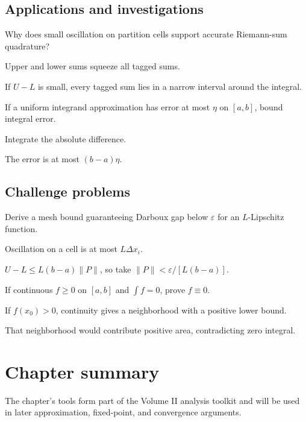 \subsection*{Applications and investigations}

\begin{exercise}\label{exr:ii10-expand-13}
Why does small oscillation on partition cells support accurate Riemann-sum quadrature?
\end{exercise}
\begin{hint}
Upper and lower sums squeeze all tagged sums.
\end{hint}
\begin{solution}
If \(U-L\) is small, every tagged sum lies in a narrow interval around the integral.
\end{solution}

\begin{exercise}\label{exr:ii10-expand-14}
If a uniform integrand approximation has error at most \(\eta\) on \([a,b]\), bound integral error.
\end{exercise}
\begin{hint}
Integrate the absolute difference.
\end{hint}
\begin{solution}
The error is at most \((b-a)\eta\).
\end{solution}

\subsection*{Challenge problems}

\begin{exercise}\label{exr:ii10-expand-15}
Derive a mesh bound guaranteeing Darboux gap below \(\varepsilon\) for an \(L\)-Lipschitz function.
\end{exercise}
\begin{hint}
Oscillation on a cell is at most \(L\Delta x_i\).
\end{hint}
\begin{solution}
\(U-L\le L(b-a)\|P\|\), so take \(\|P\|<\varepsilon/[L(b-a)]\).
\end{solution}

\begin{exercise}\label{exr:ii10-expand-16}
If continuous \(f\ge0\) on \([a,b]\) and \(\int f=0\), prove \(f\equiv0\).
\end{exercise}
\begin{hint}
If \(f(x_0)>0\), continuity gives a neighborhood with a positive lower bound.
\end{hint}
\begin{solution}
That neighborhood would contribute positive area, contradicting zero integral.
\end{solution}
\section*{Chapter summary}
The chapter's tools form part of the Volume II analysis toolkit and will be used in later approximation, fixed-point, and convergence arguments.
